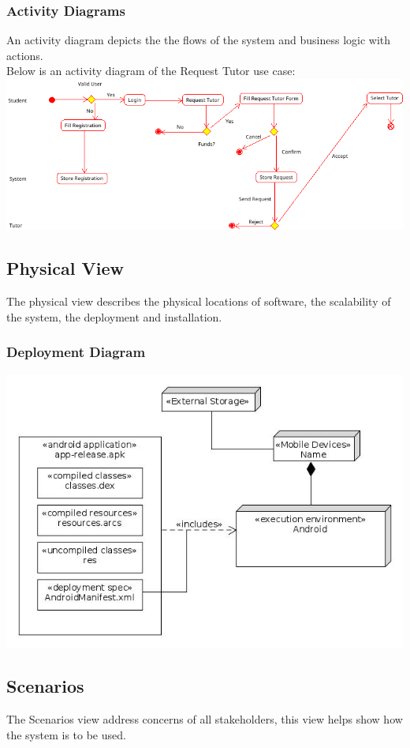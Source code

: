 \documentclass[12pt]{article}
\begin{document}
\subsubsection{Activity Diagrams}
An activity diagram depicts the the flows of the system and business logic with actions.\\
Below is an activity diagram of the Request Tutor use case:\\
\includegraphics[width=140mm]{./activitydiagram.png}

\subsection{Physical View}
The physical view describes the physical locations of software, the scalability of the system, the deployment and installation.
\subsubsection{Deployment Diagram}

\includegraphics[width=140mm]{./Deployment.jpg}

\subsection{Scenarios}
The Scenarios view address concerns of all stakeholders, this view helps show how the system is to be used.
\end{document}
